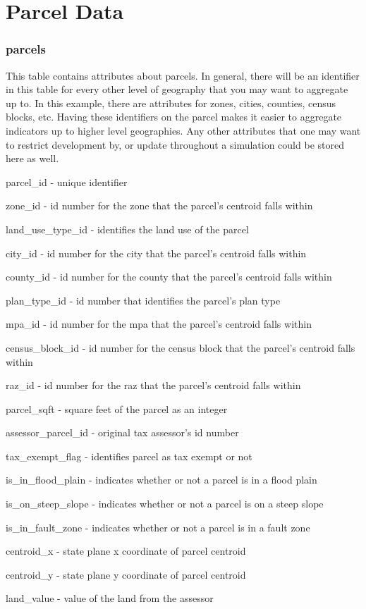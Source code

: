 \chapter{Parcel Data}

\subsection{parcels} 
This table contains attributes about parcels.  In general, there will be an identifier in this table for every other level of geography that you may want to aggregate up to.  In this example, there are attributes for zones, cities, counties, census blocks, etc.  Having these identifiers on the parcel makes it easier to aggregate indicators up to higher level geographies.  Any other attributes that one may want to restrict development by, or update throughout a simulation could be stored here as well.

\begin{description}
\item parcel\_id - unique identifier
\item zone\_id - id number for the zone that the parcel's centroid falls within
\item land\_use\_type\_id - identifies the land use of the parcel
\item city\_id - id number for the city that the parcel's centroid falls within
\item county\_id - id number for the county that the parcel's centroid falls within
\item plan\_type\_id - id number that identifies the parcel's plan type
\item mpa\_id - id number for the mpa that the parcel's centroid falls within
\item census\_block\_id - id number for the census block that the parcel's centroid falls within
\item raz\_id - id number for the raz that the parcel's centroid falls within
\item parcel\_sqft - square feet of the parcel as an integer
\item assessor\_parcel\_id - original tax assessor's id number
\item tax\_exempt\_flag - identifies parcel as tax exempt or not
\item is\_in\_flood\_plain - indicates whether or not a parcel is in a flood plain
\item is\_on\_steep\_slope - indicates whether or not a parcel is on a steep slope
\item is\_in\_fault\_zone - indicates whether or not a parcel is in a fault zone
\item centroid\_x - state plane x coordinate of parcel centroid
\item centroid\_y - state plane y coordinate of parcel centroid
\item land\_value - value of the land from the assessor 
\end{description}

